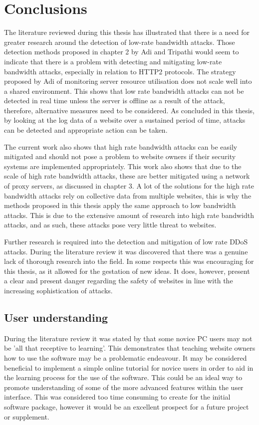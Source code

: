 \section{Conclusions}

The literature reviewed during this thesis has illustrated that there is a need for greater research around the detection of low-rate bandwidth attacks. Those detection methods proposed in chapter 2 by Adi and Tripathi would seem to indicate that there is a problem with detecting and mitigating low-rate bandwidth attacks, especially in relation to HTTP2 protocols. The strategy proposed by Adi of monitoring server resource utilisation does not scale well into a shared environment. This shows that low rate bandwidth attacks can not be detected in real time unless the server is offline as a result of the attack, therefore, alternative measures need to be considered. As concluded in this thesis, by looking at the log data of a website over a sustained period of time, attacks can be detected and appropriate action can be taken.

The current work also shows that high rate bandwidth attacks can be easily mitigated and should not pose a problem to website owners if their security systems are implemented appropriately. This work also shows that due to the scale of high rate bandwidth attacks, these are better mitigated using a network of proxy servers, as discussed in chapter 3. A lot of the solutions for the high rate bandwidth attacks rely on collective data from multiple websites, this is why the methods proposed in this thesis apply the same approach to low bandwidth attacks. This is due to the extensive amount of research into high rate bandwidth attacks, and as such, these attacks pose very little threat to websites. 

Further research is required into the detection and mitigation of low rate DDoS attacks. During the literature review it was discovered that there was a genuine lack of thorough research into the field. In some respects this was encouraging for this thesis, as it allowed for the gestation of new ideas. It does, however, present a clear and present danger regarding the safety of websites in line with the increasing sophistication of attacks.


\subsection{User understanding}

During the literature review it was stated by \citeauthor{cranor2008framework} that some novice PC users may not be 'all that receptive to learning'. This demonstrates that teaching website owners how to use the software may be a problematic endeavour. It may be considered beneficial to implement a simple online tutorial for novice users in order to aid in the learning process for the use of the software. This could be an ideal way to promote understanding of some of the more advanced features within the user interface. This was considered too time consuming to create for the initial software package, however it would be an excellent prospect for a future project or supplement.

